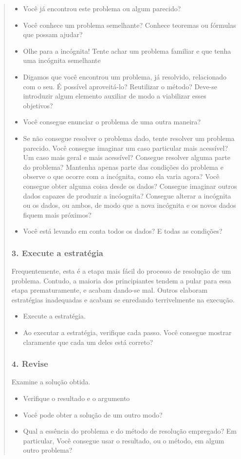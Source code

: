 \documentclass[10pt,a4paper]{report}
\theoremstyle{definition}
\begin{document}
\begin{quote}
\begin{itemize}
 \item        Você já encontrou este problema ou algum parecido?
  \item      Você conhece um problema semelhante? Conhece teoremas ou fórmulas que possam ajudar?
 \item        Olhe para a incógnita! Tente achar um problema familiar e que tenha uma incógnita semelhante
 \item       Digamos que você encontrou um problema, já resolvido, relacionado com o seu. É possível aproveitá-lo? Reutilizar o método? Deve-se introduzir algum elemento auxiliar de modo a viabilizar esses objetivos?
  \item      Você consegue enunciar o problema de uma outra maneira?
 \item       Se não consegue resolver o problema dado, tente resolver um problema parecido. Você consegue imaginar um caso particular mais acessível? Um caso mais geral e mais acessível? Consegue resolver alguma parte do problema? Mantenha apenas parte das condições do problema e observe o que ocorre com a incógnita, como ela varia agora? Você consegue obter alguma coisa desde os dados? Consegue imaginar outros dados capazes de produzir a incóognita? Consegue alterar a incógnita ou os dados, ou ambos, de modo que a nova incógnita e os novos dados fiquem mais próximos?
 \item       Você está levando em conta todos os dados? E todas as condições?
\end{itemize}


    \subsubsection{3. Execute a estratégia}

    Frequentemente, esta é a etapa mais fácil do processo de resolução de um problema. Contudo, a maioria dos principiantes tendem a pular para essa etapa prematuramente, e acabam dando-se mal. Outros elaboram estratégias inadequadas e acabam se enredando terrivelmente na execução.

\begin{itemize}
 \item      Execute a estratégia.
  \item      Ao executar a estratégia, verifique cada passo. Você consegue mostrar claramente que cada um deles está correto?

\end{itemize}

    \subsubsection{4. Revise}
Examine a solução obtida.
\begin{itemize}
\item        Verifique o resultado e o argumento
\item        Você pode obter a solução de um outro modo?
\item        Qual a essência do problema e do método de resolução empregado? Em particular, Você consegue usar o resultado, ou o método, em algum outro problema?
\end{itemize}
\end{quote}
\end{document}
